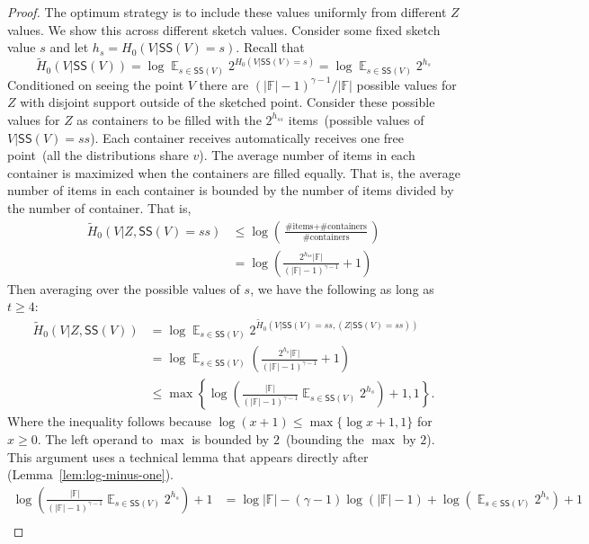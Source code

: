 \documentclass[11pt]{article}
\newcommand{\lemref}[1]{\mbox{Lemma~\ref{#1}}}
\DeclareMathOperator*{\expe}{\mathbb{E}}
\newcommand{\class}[1]{{\ensuremath{\mathsf{#1}}}}
\newcommand{\sketch}{\ensuremath{\class{SS}}\xspace}
\begin{document}
\begin{proof}
The optimum strategy is to include these values uniformly from different $Z$ values.
We show this across different sketch values.  Consider some fixed sketch value $s$ and let $h_s= H_0(V | \sketch(V) = s)$.  %
Recall that 
\[
\tilde{H}_0(V | \sketch(V)) =  \log \expe_{s\in \sketch(V)} 2^{H_0(V | \sketch(V) = s)}  = \log \expe_{s\in \sketch(V)} 2^{h_s} %
\]  
Conditioned on seeing the point $V$ there are $(|\mathbb{F}|-1)^{\gamma-1}/|\mathbb{F}|$ possible values for $Z$ with disjoint support outside of the sketched point.  Consider these possible values for $Z$ as containers to be filled with the $2^{h_{ss}}$ items~(possible values of $V | \sketch(V)=ss$).  Each container receives automatically receives one free point~(all the distributions share $v$).  The average number of items in each container is maximized when the containers are filled equally.  That is, the average number of items in each container is bounded by the number of items divided by the number of container.  That is, 
\begin{align*}
\tilde{H}_0(V |Z  , \sketch(V) = ss) &\le \log \left(\frac{\text{\# items}+\text{\# containers}}{\text{\# containers}}\right)\\
&= \log \left(\frac{2^{h_{ss}}|\mathbb{F}|}{(|\mathbb{F}|-1)^{\gamma-1}} +1 \right)
\end{align*}
Then averaging over the possible values of $s$, we have the following as long as $t\ge 4$:
\begin{align*}
\tilde{H}_0(V |Z , \sketch(V) ) &= \log \expe_{s\in \sketch(V)} 2^{\tilde{H}_0(V |  \sketch(V) =ss , (Z| \sketch(V) =ss) )}\\
&= \log\expe_{s\in \sketch(V)} \left(\frac{2^{h_s}|\mathbb{F}|}{(|\mathbb{F}|-1)^{\gamma-1}} +1\right)\\
&\le \max\left\{ \log \left(\frac{|\mathbb{F}|}{(|\mathbb{F}|-1)^{\gamma-1}} \expe_{s\in \sketch(V)} 2^{h_s}\right)+1, 1\right\}.
\end{align*}
Where the inequality follows because $\log (x+1) \le \max\{ \log x+ 1,1\}$ for $x\ge 0$.
The left operand to $\max$ is bounded by $2$~(bounding the $\max$ by $2$).  This argument uses a technical lemma that appears directly after (\lemref{lem:log-minus-one}).
\begin{align*}
\log \left(\frac{|\mathbb{F}|}{(|\mathbb{F}|-1)^{\gamma-1}} \expe_{s\in \sketch(V)} 2^{h_s}\right)+1
&=\log |\mathbb{F}| - (\gamma -1)\log (|\mathbb{F}|-1) + \log \left(\expe_{s\in \sketch(V)} 2^{h_s}\right) +1\\

\end{align*}
\end{proof}
\end{document}
